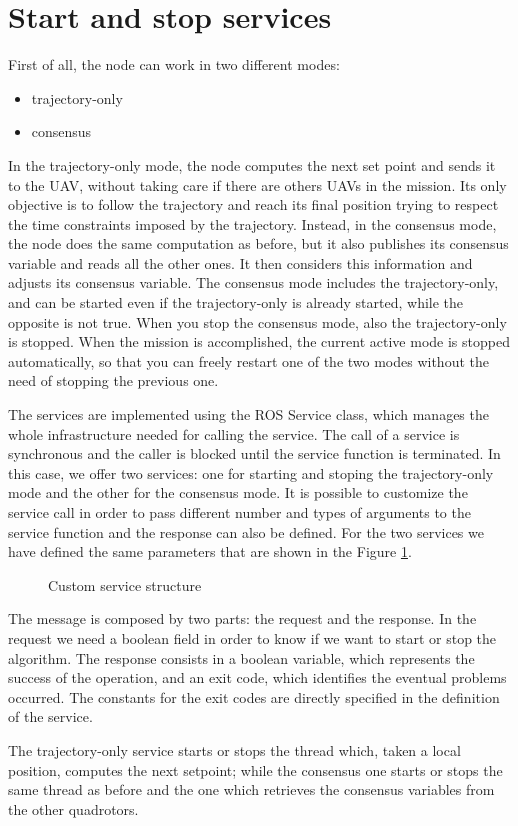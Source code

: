 \section{Start and stop services\label{sec:start_stop_services}}

First of all, the node can work in two different modes:
\begin{itemize}
  \item trajectory-only
  \item consensus
\end{itemize}

In the trajectory-only mode, the node computes the next set point and sends it to
the UAV, without taking care if there are others UAVs in the mission. Its only objective
is to follow the trajectory and reach its final position trying to respect the time
constraints imposed by the trajectory.
Instead, in the consensus mode, the node does the same computation as before, but
it also publishes its consensus variable and reads all the other ones.
It then considers this information and adjusts its consensus variable.
The consensus mode includes the trajectory-only, and can be started even if the
trajectory-only is already started, while the opposite is not true. When you stop
the consensus mode, also the trajectory-only is stopped.
When the mission is accomplished, the current active mode is stopped automatically,
so that you can freely restart one of the two modes without the need of stopping
the previous one.

The services are implemented using the ROS Service class, which manages the whole
infrastructure needed for calling the service. The call of a service is
synchronous and the caller is blocked until the service function is terminated.
In this case, we offer two services: one for starting and stoping the trajectory-only
mode and the other for the consensus mode.
It is possible to customize the service call in order to pass different number
and types of arguments to the service function and the response can also be
defined.
For the two services we have defined the same parameters that are shown in the Figure
\ref{fig:custom_service}.

\begin{figure}
\centering
  
\caption{Custom service structure}
\label{fig:custom_service}
\end{figure}

The message is composed by two parts: the request and the response.
In the request we need a boolean field in order to know if
we want to start or stop the algorithm. The response consists in a boolean variable,
which represents the success of the operation, and an exit code, which identifies
the eventual problems occurred. The constants for the exit codes are directly specified
in the definition of the service.

The trajectory-only service starts or stops the thread which, taken a local position,
computes the next setpoint; while the consensus one starts or stops the same
thread as before and the one which retrieves the consensus variables from the other
quadrotors.
